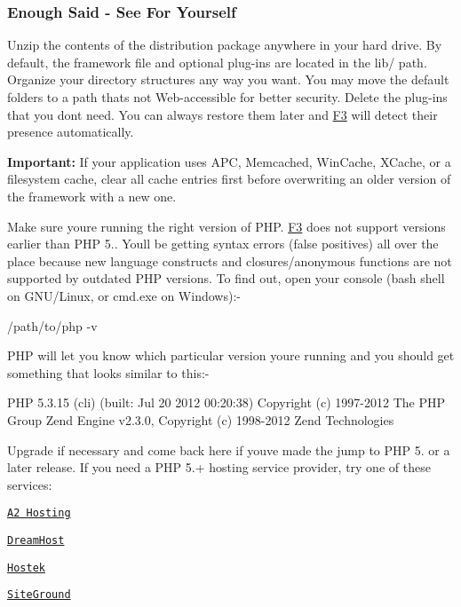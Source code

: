 \subsubsection*{Enough Said -\/ See For Yourself}

Unzip the contents of the distribution package anywhere in your hard drive. By default, the framework file and optional plug-\/ins are located in the {\ttfamily lib/} path. Organize your directory structures any way you want. You may move the default folders to a path that\textquotesingle{}s not Web-\/accessible for better security. Delete the plug-\/ins that you don\textquotesingle{}t need. You can always restore them later and \hyperlink{class_f3}{F3} will detect their presence automatically.

{\bfseries Important\+:} If your application uses A\+PC, Memcached, Win\+Cache, X\+Cache, or a filesystem cache, clear all cache entries first before overwriting an older version of the framework with a new one.

Make sure you\textquotesingle{}re running the right version of P\+HP. \hyperlink{class_f3}{F3} does not support versions earlier than P\+HP 5.. You\textquotesingle{}ll be getting syntax errors (false positives) all over the place because new language constructs and closures/anonymous functions are not supported by outdated P\+HP versions. To find out, open your console ({\ttfamily bash} shell on G\+N\+U/\+Linux, or {\ttfamily cmd.\+exe} on Windows)\+:-\/


\begin{DoxyCode}
/path/to/php -v
\end{DoxyCode}


P\+HP will let you know which particular version you\textquotesingle{}re running and you should get something that looks similar to this\+:-\/


\begin{DoxyCode}
PHP 5.3.15 (cli) (built: Jul 20 2012 00:20:38)
Copyright (c) 1997-2012 The PHP Group
Zend Engine v2.3.0, Copyright (c) 1998-2012 Zend Technologies
\end{DoxyCode}


Upgrade if necessary and come back here if you\textquotesingle{}ve made the jump to P\+HP 5. or a later release. If you need a P\+HP 5.+ hosting service provider, try one of these services\+:


\begin{DoxyItemize}
\item \href{http://www.a2hosting.com/2461-15-1-72.html}{\tt A2 Hosting}
\item \href{http://www.dreamhost.com/r.cgi?665472}{\tt Dream\+Host}
\item \href{http://hostek.com/aff.php?aff=364&plat=L}{\tt Hostek}
\item \href{http://www.siteground.com/index.htm?referrerid=155694}{\tt Site\+Ground}
\end{DoxyItemize}

